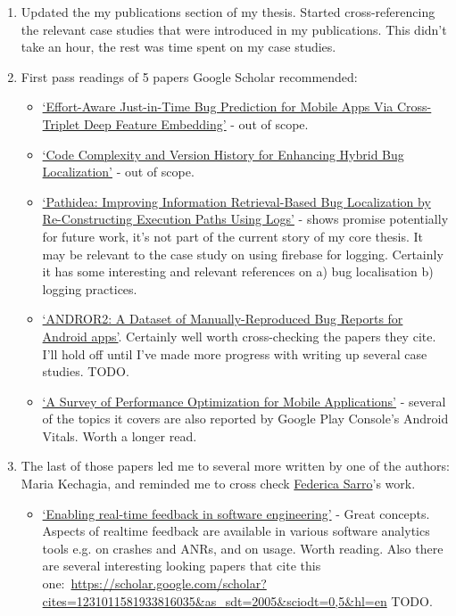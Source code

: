 \begin{enumerate}
    \item Updated the my publications section of my thesis. Started cross-referencing the relevant case studies that were introduced in my publications. This didn't take an hour, the rest was time spent on my case studies.
    \item First pass readings of 5 papers Google Scholar recommended: 
    \begin{itemize}
        \item \href{https://10.1109/TR.2021.3066170}{`Effort-Aware Just-in-Time Bug Prediction for Mobile Apps Via Cross-Triplet Deep Feature Embedding'} - out of scope.
        \item \href{https://10.1109/ACCESS.2021.3074266}{`Code Complexity and Version History for Enhancing Hybrid Bug Localization'} - out of scope.
        \item \href{https://10.1109/TSE.2021.3071473}{`Pathidea: Improving Information Retrieval-Based Bug Localization by Re-Constructing Execution Paths Using Logs'} - shows promise potentially for future work, it's not part of the current story of my core thesis. It may be relevant to the case study on using firebase for logging. Certainly it has some interesting and relevant references on a) bug localisation b) logging practices.
        \item \href{http://www.ece.ubc.ca/~mjulia/publications/AndroR2_2021.pdf}{`ANDROR2: A Dataset of Manually-Reproduced Bug Reports for Android apps'}. Certainly well worth cross-checking the papers they cite. I'll hold off until I've made more progress with writing up several case studies. TODO.
        \item \href{https://10.1109/TSE.2021.3071193}{`A Survey of Performance Optimization for Mobile Applications'} - several of the topics it covers are also reported by Google Play Console's Android Vitals. Worth a longer read.
    \end{itemize}
    \item The last of those papers led me to several more written by one of the authors: Maria Kechagia, and reminded me to cross check \href{http://www0.cs.ucl.ac.uk/staff/F.Sarro/publications.html}{Federica Sarro}'s work. 
    \begin{itemize}
        \item \href{https://doi.org/10.1145/3183399.3183416}{`Enabling real-time feedback in software engineering'} - Great concepts. Aspects of realtime feedback are available in various software analytics tools e.g. on crashes and ANRs, and on usage. Worth reading. Also there are several interesting looking papers that cite this one:~\url{https://scholar.google.com/scholar?cites=1231011581933816035&as_sdt=2005&sciodt=0,5&hl=en} TODO.

\end{itemize}
\end{enumerate}
